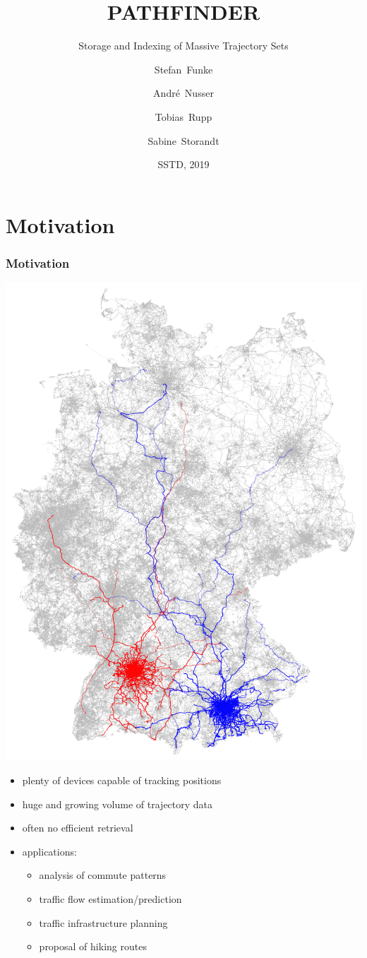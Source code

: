 \documentclass[10pt, t,
aspectratio=1610,%
usenames,
dvipsnames,
]{beamer}
\title[Pathfinder] %
{PATHFINDER}
\subtitle{Storage and Indexing of Massive Trajectory Sets}
\author[Funke, Nusser, Rupp, Storandt] %
{Stefan~Funke\inst{1} \and Andr\'{e}~Nusser\inst{2} \and Tobias~Rupp\inst{3} \and Sabine~Storandt\inst{4}}
\institute[Universities] %
{
	\inst{1}%
	University of Stuttgart
	\and
	\inst{2}%
	Max Planck Institute for Informatics
	\and
	\inst{3}%
	University of Stuttgart
	\and
	\inst{4}%
	University of Konstanz
}
\date[SSTD 2019] %
{SSTD, 2019}
\begin{document}
\frame{\titlepage}

\section{Motivation}
\begin{frame}
	\frametitle{Motivation}
	\begin{minipage}[t]{0.45\textwidth}
		\vspace{0pt}
		\includegraphics[height=0.9\textheight]{images/trajectories.png}
	\end{minipage}
	\hfill
	\begin{minipage}[t]{0.45\textwidth}
		\vspace{0pt}
		\begin{itemize}
			\item<1-> plenty of devices capable of tracking positions
			\item<2-> huge and growing volume of trajectory data
			\item<3-> often no efficient retrieval
			\item<4-> applications:
			      \begin{itemize}
				      \item<5-> analysis of commute patterns
				      \item<6-> traffic flow estimation/prediction
				      \item<7-> traffic infrastructure planning
				      \item<8-> proposal of hiking routes
			      \end{itemize}


\end{itemize}
\end{minipage}
\end{frame}
\end{document}
